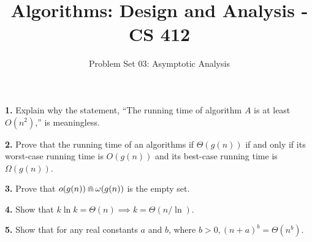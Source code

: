 \documentclass[addpoints]{exam}
\title{Algorithms: Design and Analysis - CS 412 }
\author{Problem Set 03: Asymptotic Analysis}
\date{}
\begin{document}
\maketitle

\begin{questions}
  \question
  \textbf{1. } Explain why the statement, ``The running time of algorithm $A$ is at least $ O(n^2) $,'' is meaningless.
  \begin{solution}

  \end{solution}

  \question
  \textbf{2. } Prove that the running time of an algorithms if $ \Theta(g(n)) $ if and only if its worst-case running time is $ O(g(n)) $ and its best-case running time is $ \Omega(g(n)) $.
  \begin{solution}

  \end{solution}

  \question
  \textbf{3. } Prove that $ o(g(n)) \doublecap \omega(g(n)) $ is the empty set.
  \begin{solution}

  \end{solution}

  \question
  \textbf{4. } Show that $ k \ln k = \Theta(n) \implies k = \Theta(n / \ln) $.
  \begin{solution}

  \end{solution}

  \question
  \textbf{5. } Show that for any real constants $a$ and $b$, where $ b > 0, (n + a)^b = \Theta(n^b) $.
  \begin{solution}
    
  \end{solution}


\end{questions}
\end{document}
